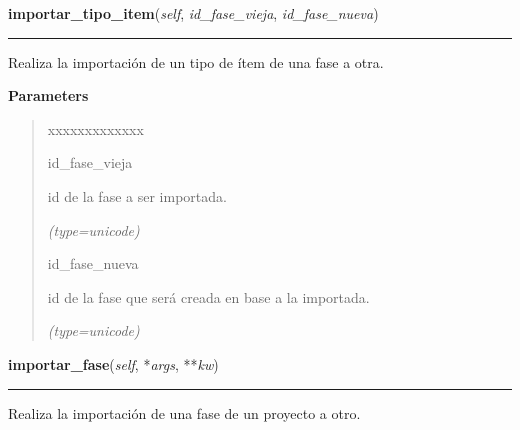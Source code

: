 \hspace{.8\funcindent}\begin{boxedminipage}{\funcwidth}

    \raggedright \textbf{importar\_tipo\_item}(\textit{self}, \textit{id\_fase\_vieja}, \textit{id\_fase\_nueva})

    \vspace{-1.5ex}

    \rule{\textwidth}{0.5\fboxrule}
\setlength{\parskip}{2ex}
    Realiza la importación de un tipo de ítem de una fase a otra.

\setlength{\parskip}{1ex}
      \textbf{Parameters}
      \vspace{-1ex}

      \begin{quote}
        \begin{Ventry}{xxxxxxxxxxxxx}

          \item[id\_fase\_vieja]

          id de la fase a ser importada.

            {\it (type=unicode)}

          \item[id\_fase\_nueva]

          id de la fase que será creada en base a la importada.

            {\it (type=unicode)}

        \end{Ventry}

      \end{quote}

    \end{boxedminipage}

    \label{saip:controllers:fase_controller_2:FaseControllerNuevo:importar_fase}

    \vspace{0.5ex}

\hspace{.8\funcindent}\begin{boxedminipage}{\funcwidth}

    \raggedright \textbf{importar\_fase}(\textit{self}, *\textit{args}, **\textit{kw})

    \vspace{-1.5ex}

    \rule{\textwidth}{0.5\fboxrule}
\setlength{\parskip}{2ex}
    Realiza la importación de una fase de un proyecto a otro.

\setlength{\parskip}{1ex}
    \end{boxedminipage}



